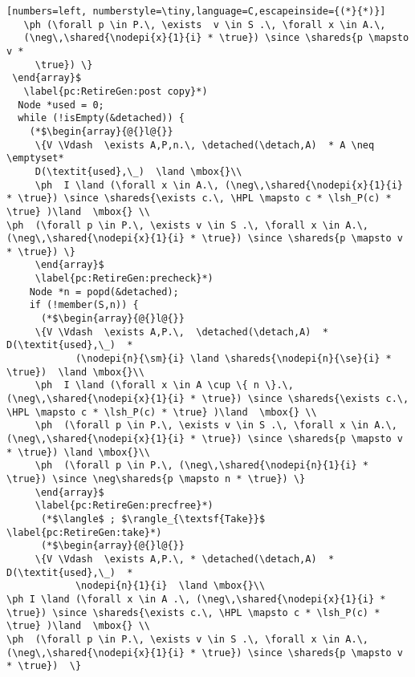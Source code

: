 \begin{figure*}[t]
{\begin{lstlisting}[numbers=left, numberstyle=\tiny,language=C,escapeinside={(*}{*)}]
   \ph (\forall p \in P.\, \exists  v \in S .\, \forall x \in A.\,
   (\neg\,\shared{\nodepi{x}{1}{i} * \true}) \since \shareds{p \mapsto v *
     \true}) \}
 \end{array}$
   \label{pc:RetireGen:post copy}*)     
  Node *used = 0;
  while (!isEmpty(&detached)) {
    (*$\begin{array}{@{}l@{}} 
     \{V \Vdash  \exists A,P,n.\, \detached(\detach,A)  * A \neq \emptyset*
     D(\textit{used},\_)  \land \mbox{}\\ 
     \ph  I \land (\forall x \in A.\, (\neg\,\shared{\nodepi{x}{1}{i} * \true}) \since \shareds{\exists c.\, \HPL \mapsto c * \lsh_P(c) * \true} )\land  \mbox{} \\
\ph  (\forall p \in P.\, \exists v \in S .\, \forall x \in A.\, (\neg\,\shared{\nodepi{x}{1}{i} * \true}) \since \shareds{p \mapsto v * \true}) \}
     \end{array}$
     \label{pc:RetireGen:precheck}*)     
    Node *n = popd(&detached); 
    if (!member(S,n)) {
      (*$\begin{array}{@{}l@{}} 
     \{V \Vdash  \exists A,P.\,  \detached(\detach,A)  * D(\textit{used},\_)  * 
     		(\nodepi{n}{\sm}{i} \land \shareds{\nodepi{n}{\se}{i} * \true})  \land \mbox{}\\
     \ph  I \land (\forall x \in A \cup \{ n \}.\, (\neg\,\shared{\nodepi{x}{1}{i} * \true}) \since \shareds{\exists c.\, \HPL \mapsto c * \lsh_P(c) * \true} )\land  \mbox{} \\
     \ph  (\forall p \in P.\, \exists v \in S .\, \forall x \in A.\, (\neg\,\shared{\nodepi{x}{1}{i} * \true}) \since \shareds{p \mapsto v * \true}) \land \mbox{}\\
     \ph  (\forall p \in P.\, (\neg\,\shared{\nodepi{n}{1}{i} * \true}) \since \neg\shareds{p \mapsto n * \true}) \}
     \end{array}$
     \label{pc:RetireGen:precfree}*)     
      (*$\langle$ ; $\rangle_{\textsf{Take}}$ \label{pc:RetireGen:take}*)
      (*$\begin{array}{@{}l@{}} 
     \{V \Vdash  \exists A,P.\, * \detached(\detach,A)  * D(\textit{used},\_)  * 
     		\nodepi{n}{1}{i}  \land \mbox{}\\
\ph I \land (\forall x \in A .\, (\neg\,\shared{\nodepi{x}{1}{i} * \true}) \since \shareds{\exists c.\, \HPL \mapsto c * \lsh_P(c) * \true} )\land  \mbox{} \\
\ph  (\forall p \in P.\, \exists v \in S .\, \forall x \in A.\, (\neg\,\shared{\nodepi{x}{1}{i} * \true}) \since \shareds{p \mapsto v * \true})  \}

\end{lstlisting}}
\end{figure*}
